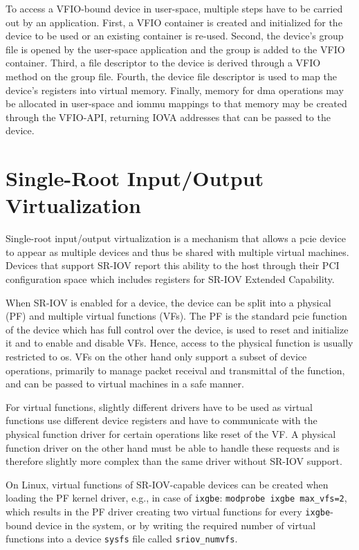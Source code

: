 To access a VFIO-bound device in user-space, multiple steps have to be carried
out by an application. First, a VFIO container is created and initialized for
the device to be used or an existing container is re-used. Second, the device's
group file is opened by the user-space application and the group is added to the
VFIO container. Third, a file descriptor to the device is derived through a VFIO
method on the group file. Fourth, the device file descriptor is used to map the
device's registers into virtual memory. Finally, memory for \ac{dma} operations
may be allocated in user-space and \ac{iommu} mappings to that memory may be
created through the VFIO-API, returning IOVA addresses that can be passed to the
device.


\section{Single-Root Input/Output Virtualization}
\label{sec:sriov}

Single-root input/output virtualization is a mechanism that allows a \ac{pcie}
device to appear as multiple devices and thus be shared with multiple virtual
machines. Devices that support SR-IOV report this ability to the host through
their PCI configuration space which includes registers for SR-IOV Extended
Capability.

When SR-IOV is enabled for a device, the device can be split into a physical
(PF) and multiple virtual functions (VFs). The PF is the standard \ac{pcie}
function of the device which has full control over the device, is used to reset
and initialize it and to enable and disable VFs. Hence, access to the physical
function is usually restricted to \ac{os}. VFs on the other hand only support a
subset of device operations, primarily to manage packet receival and transmittal
of the function, and can be passed to virtual machines in a safe manner.

For virtual functions, slightly different drivers have to be used as virtual
functions use different device registers and have to communicate with the
physical function driver for certain operations like reset of the VF. A physical
function driver on the other hand must be able to handle these requests and is
therefore slightly more complex than the same driver without SR-IOV support.

On Linux, virtual functions of SR-IOV-capable devices can be created when
loading the PF kernel driver, e.g., in case of \texttt{ixgbe}: \texttt{modprobe
ixgbe max\_vfs=2}, which results in the PF driver creating two virtual functions
for every \texttt{ixgbe}-bound device in the system, or by writing the required
number of virtual functions into a device \texttt{sysfs} file called
\texttt{sriov\_numvfs}.

